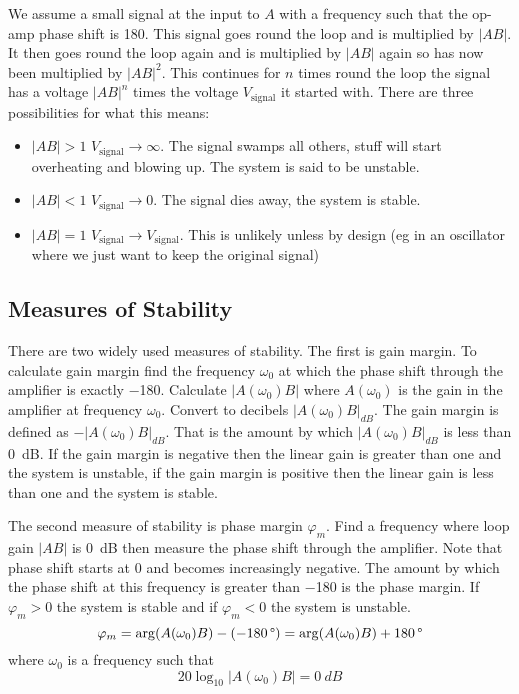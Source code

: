 \documentclass{article}
\begin{document}
    We assume a small signal at the input to \(A\) with a frequency such that the op-amp phase shift is \SI{180}{\SIUnitSymbolDegree}.
    This signal goes round the loop and is multiplied by \(|AB|\).
    It then goes round the loop again and is multiplied by \(|AB|\) again so has now been multiplied by \(|AB|^2\).
    This continues for \(n\) times round the loop the signal has a voltage \(|AB|^n\) times the voltage \(V_\text{signal}\) it started with.
    There are three possibilities for what this means:
    \begin{itemize}
        \item \(|AB|>1\) \(V_\text{signal}\to \infty\). The signal swamps all others, stuff will start overheating and blowing up. The system is said to be unstable.
        \item \(|AB|<1\) \(V_\text{signal}\to 0\). The signal dies away, the system is stable.
        \item \(|AB| = 1\) \(V_\text{signal}\to V_\text{signal}\). This is unlikely unless by design (eg in an oscillator where we just want to keep the original signal)
    \end{itemize}

    \subsection{Measures of Stability}
    There are two widely used measures of stability.
    The first is gain margin.
    To calculate gain margin find the frequency \(\omega_0\) at which the phase shift through the amplifier is exactly \SI{-180}{\SIUnitSymbolDegree}.
    Calculate \(|A(\omega_0)B|\) where \(A(\omega_0)\) is the gain in the amplifier at frequency \(\omega_0\).
    Convert to decibels \(|A(\omega_0)B|_{\si{dB}}\).
    The gain margin is defined as \(-|A(\omega_0)B|_{\si{dB}}\).
    That is the amount by which \(|A(\omega_0)B|_{\si{dB}}\) is less than \SI{0}{dB}.
    If the gain margin is negative then the linear gain is greater than one and the system is unstable, if the gain margin is positive then the linear gain is less than one and the system is stable.
    
    The second measure of stability is phase margin \(\varphi_m\).
    Find a frequency where loop gain \(|AB|\) is \SI{0}{dB} then measure the phase shift through the amplifier.
    Note that phase shift starts at \SI{0}{\SIUnitSymbolDegree} and becomes increasingly negative.
    The amount by which the phase shift at this frequency is greater than \SI{-180}{\SIUnitSymbolDegree} is the phase margin.
    If \(\varphi_m > 0\) the system is stable and if \(\varphi_m < 0\) the system is unstable.
    \[\varphi_m = \arg(A(\omega_0)B) - (-\SI{180}{\SIUnitSymbolDegree}) = \arg(A(\omega_0)B) + \SI{180}{\SIUnitSymbolDegree}\]
    where \(\omega_0\) is a frequency such that
    \[20\log_{10}|A(\omega_0)B| = \SI{0}{dB}\]
    
\end{document}
